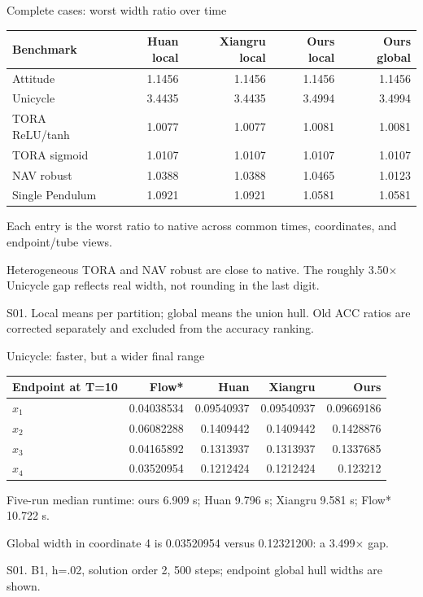 \documentclass[aspectratio=169,11pt]{beamer}
\newcommand{\src}[1]{\par\vfill{\fontsize{7}{9}\selectfont\color{gray}#1\par}}
\begin{document}
\begin{frame}[t]{Complete cases: worst width ratio over time}
\relax
\relax
{\small\setlength{\tabcolsep}{3.2pt}\renewcommand{\arraystretch}{1.18}
\noindent\begin{tabular*}{\linewidth}{@{\extracolsep{\fill}}lrrrr@{}}\toprule
\textbf{Benchmark} & \textbf{Huan local} & \textbf{Xiangru local} & \textbf{Ours local} & \textbf{Ours global}\\ \midrule
Attitude & 1.1456 & 1.1456 & 1.1456 & 1.1456\\
Unicycle & 3.4435 & 3.4435 & 3.4994 & 3.4994\\
TORA ReLU/tanh & 1.0077 & 1.0077 & 1.0081 & 1.0081\\
TORA sigmoid & 1.0107 & 1.0107 & 1.0107 & 1.0107\\
NAV robust & 1.0388 & 1.0388 & 1.0465 & 1.0123\\
Single Pendulum & 1.0921 & 1.0921 & 1.0581 & 1.0581\\
\bottomrule\end{tabular*}\par{}}\vspace{0.3cm}Each entry is the worst ratio to native across common times, coordinates, and endpoint/tube views.\par{}Heterogeneous TORA and NAV robust are close to native. The roughly 3.50\(\times\) Unicycle gap reflects real width, not rounding in the last digit.
\src{S01. Local means per partition; global means the union hull. Old ACC ratios are corrected separately and excluded from the accuracy ranking.}
\end{frame}

\begin{frame}[t]{Unicycle: faster, but a wider final range}
\relax
\relax
{\small\setlength{\tabcolsep}{3.2pt}\renewcommand{\arraystretch}{1.18}
\noindent\begin{tabular*}{\linewidth}{@{\extracolsep{\fill}}lrrrr@{}}\toprule
\textbf{Endpoint at T=10} & \textbf{Flow*} & \textbf{Huan} & \textbf{Xiangru} & \textbf{Ours}\\ \midrule
\(x_1\) & 0.04038534 & 0.09540937 & 0.09540937 & 0.09669186\\
\(x_2\) & 0.06082288 & 0.1409442 & 0.1409442 & 0.1428876\\
\(x_3\) & 0.04165892 & 0.1313937 & 0.1313937 & 0.1337685\\
\(x_4\) & 0.03520954 & 0.1212424 & 0.1212424 & 0.123212\\
\bottomrule\end{tabular*}\par{}}\vspace{0.35cm}Five-run median runtime: ours 6.909 s; Huan 9.796 s; Xiangru 9.581 s; Flow* 10.722 s.\par{}Global width in coordinate 4 is 0.03520954 versus 0.12321200: a 3.499\(\times\) gap.
\src{S01. B1, h=.02, solution order 2, 500 steps; endpoint global hull widths are shown.}
\end{frame}
\end{document}
